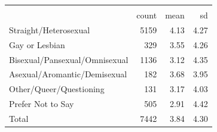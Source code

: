 \begin{tabular}{lrrr}
\toprule
                    &\multicolumn{3}{c}{}                  \\
                    &       count&        mean&          sd\\
\midrule
Straight/Heterosexual&        5159&        4.13&        4.27\\
Gay or Lesbian      &         329&        3.55&        4.26\\
Bisexual/Pansexual/Omnisexual&        1136&        3.12&        4.35\\
Asexual/Aromantic/Demisexual&         182&        3.68&        3.95\\
Other/Queer/Questioning&         131&        3.17&        4.03\\
Prefer Not to Say   &         505&        2.91&        4.42\\
\midrule 
Total               &        7442&        3.84&        4.30\\
\bottomrule
\end{tabular}
